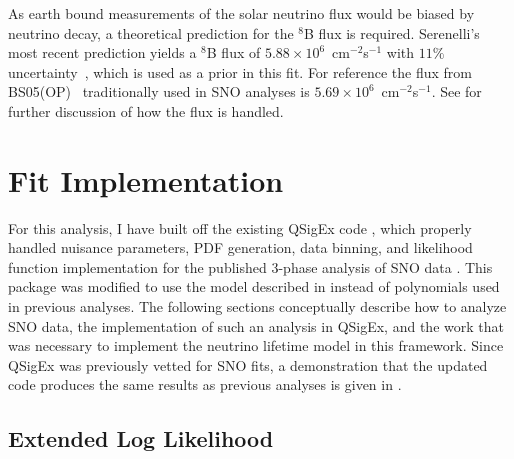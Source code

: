 As earth bound measurements of the solar neutrino flux would be biased by neutrino decay, a theoretical prediction for the $^8$B flux is required.
Serenelli's most recent prediction yields a $^8$B flux of $5.88\times10^{6}$~cm$^{-2}$s$^{-1}$ with $11\%$ uncertainty~\cite{serenelli}, which is used as a prior in this fit.
For reference the flux from BS05(OP)~\cite{bs05op} traditionally used in SNO analyses is $5.69\times10^6$~cm$^{-2}$s$^{-1}$.
See  for further discussion of how the flux is handled.

\section{Fit Implementation}
\label{fit_impl}

For this analysis, I have built off the existing QSigEx code \cite{plthesis}, which properly handled nuisance parameters, PDF generation, data binning, and likelihood function implementation for the published 3-phase analysis of SNO data \cite{3phase}.
This package was modified to use the model described in  instead of polynomials used in previous analyses.
The following sections conceptually describe how to analyze SNO data, the implementation of such an analysis in QSigEx, and the work that was necessary to implement the neutrino lifetime model in this framework.
Since QSigEx was previously vetted for SNO fits, a demonstration that the updated code produces the same results as previous analyses is given in .

\subsection{Extended Log Likelihood}

